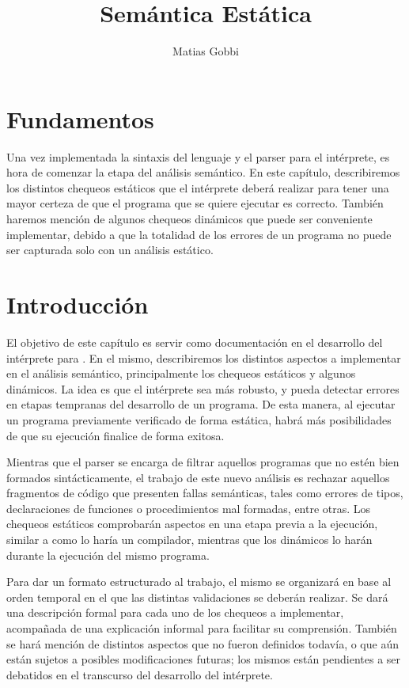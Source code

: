 \documentclass{article}
\begin{document}
\title{Semántica Estática}
\author{Matias Gobbi}
\maketitle

\section*{Fundamentos}

Una vez implementada la sintaxis del lenguaje y el parser para el intérprete, es hora de comenzar la etapa del análisis semántico.
En este capítulo, describiremos los distintos chequeos estáticos que el intérprete deberá realizar para tener una mayor certeza de que el programa que se quiere ejecutar es correcto.
También haremos mención de algunos chequeos dinámicos que puede ser conveniente implementar, debido a que la totalidad de los errores de un programa no puede ser capturada solo con un análisis estático.

\section{Introducción}

El objetivo de este capítulo es servir como documentación en el desarrollo del intérprete para \Lenguaje.
En el mismo, describiremos los distintos aspectos a implementar en el análisis semántico, principalmente los chequeos estáticos y algunos dinámicos.
La idea es que el intérprete sea más robusto, y pueda detectar errores en etapas tempranas del desarrollo de un programa.
De esta manera, al ejecutar un programa previamente verificado de forma estática, habrá más posibilidades de que su ejecución finalice de forma exitosa.

Mientras que el parser se encarga de filtrar aquellos programas que no estén bien formados sintácticamente, el trabajo de este nuevo análisis es rechazar aquellos fragmentos de código que presenten fallas semánticas, tales como errores de tipos, declaraciones de funciones o procedimientos mal formadas, entre otras.
Los chequeos estáticos comprobarán aspectos en una etapa previa a la ejecución, similar a como lo haría un compilador, mientras que los dinámicos lo harán durante la ejecución del mismo programa.

Para dar un formato estructurado al trabajo, el mismo se organizará en base al orden temporal en el que las distintas validaciones se deberán realizar.
Se dará una descripción formal para cada uno de los chequeos a implementar, acompañada de una explicación informal para facilitar su comprensión.
También se hará mención de distintos aspectos que no fueron definidos todavía, o que aún están sujetos a posibles modificaciones futuras; los mismos están pendientes a ser debatidos en el transcurso del desarrollo del intérprete.
\end{document}
